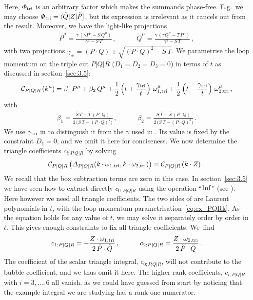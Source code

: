 Here, $\Phi_{\rm tri}$ is an arbitrary factor which makes the summands phase-free. E.g.\ we may choose $\Phi_{\rm tri}=\spAB{\check{Q}}{Z}{\check{P}}$, but its expression is irrelevant as it cancels out from the result.
Moreover, we have the light-like projections
\begin{align} \label{eq:ex_PxQx}
\check{P}^{\mu} = \frac{\gamma \, \left(\gamma P^{\mu} - S \, Q^{\mu} \right)}{\gamma^2 - S \, T} \,, \qquad \quad \check{Q}^{\mu} = \frac{\gamma \, \left(\gamma Q^{\mu} - T \, P^{\mu}\right) }{\gamma^2 - S \, T}  \,,
\end{align}
with two projections $\gamma_{\pm} = (P\cdot Q) \pm \sqrt{ (P\cdot Q)^2 -S \, T}$. We parametrise the loop momentum on the triple cut $P|Q|R$ ($D_1 = D_2 = D_3 = 0$) in terms of $t$ as discussed in section~\ref{sec:3.5}:
\begin{align} \label{eq:ex_PQRk}
\mathcal{C}_{P|Q|R}\left(k^{\mu}\right) = \beta_1 \, P^{\mu}+ \beta_2 \, Q^{\mu} + \frac{1}{2} \left(t+\frac{\gamma_{\rm tri}}{t}\right) \, \omega_{1, {\rm tri}}^{\mu}  + \frac{1}{2} \left(t-\frac{\gamma_{\rm tri}}{t}\right) \, \omega_{2, {\rm tri}}^{\mu} \,,
\end{align}
with
\begin{align}
\beta_1 = \frac{\hat{S} \, T- \hat{T} \, (P\cdot Q)}{2 \, \bigl(S \, T- (P \cdot Q)^2 \bigr)} \,, \qquad \quad
\beta_2 = \frac{S \, \hat{T}- \hat{S} \, (P\cdot Q)}{2 \, \bigl(S \, T- (P \cdot Q)^2 \bigr)} \,.
\end{align}
We use $\gamma_{\rm tri}$ in  to distinguish it from the $\gamma$ used in . Its value is fixed by the constraint $D_1 = 0$, and we omit it here for conciseness.
We now determine the triangle coefficients $c_{i;P|Q|R}$ by solving
\begin{align} \label{eq:ex_triangle_match}
\mathcal{C}_{P|Q|R}\left( \Delta_{P|Q|R}(k\cdot \omega_{1,{\rm tri}}, k\cdot \omega_{2,{\rm tri}}) \right) = \mathcal{C}_{P|Q|R} \left(k \cdot Z \right) \,.
\end{align}
We recall that the box subtraction terms are zero in this case.
In section~\ref{sec:3.5} we have seen how to extract directly $c_{0;P|Q|R}$ using the operation ``${\rm Inf}$'' (see ). Here however we need all triangle coefficients. The two sides of  are Laurent polynomials in $t$, with the loop-momentum parametrisation~\eqref{eq:ex_PQRk}. As the equation holds for any value of $t$, we may solve it separately order by order in $t$. This gives enough constraints to fix all triangle coefficients. We~find
\begin{align}
c_{1;P|Q|R} = - \frac{Z\cdot \omega_{1,{\rm tri}}}{2 \, \check{P}\cdot \check{Q}} \,, \qquad \quad
c_{2;P|Q|R} = \frac{Z\cdot \omega_{2,{\rm tri}}}{2 \, \check{P}\cdot \check{Q}} \,.
\end{align}
The coefficient of the scalar triangle integral, $c_{0;P|Q|R}$, will not contribute to the bubble coefficient, and we thus omit it here. The higher-rank coefficients, $c_{i;P|Q|R}$ with $i=3,\ldots,6$ all vanish, as we could have guessed from start by noticing that the example integral we are studying has a rank-one numerator.

